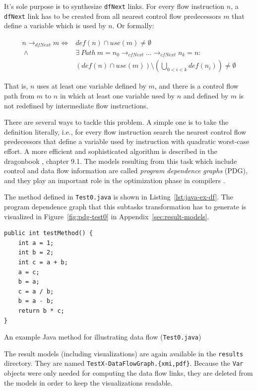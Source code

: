 \documentclass[10pt]{article}
\begin{document}
It's sole purpose is to synthesize \verb|dfNext| links.  For every flow
instruction $n$, a \verb|dfNext| link has to be created from all nearest
control flow predecessors $m$ that define a variable which is used by $n$.  Or
formally:

\begin{align*}
  n \rightarrow_{dfNext} m  \iff {} & def(n) \cap use(m) \neq \emptyset\\
  ~\land {} & \exists~Path~m = n_0 \rightarrow_{cfNext} ... \rightarrow_{cfNext} n_k = n:\\
  & \left(def(n) \cap use(m)\right) \setminus \left(\bigcup_{0 < i < k} def(n_i)\right) \neq \emptyset
\end{align*}

That is, $n$ uses at least one variable defined by $m$, and there is a control
flow path from $m$ to $n$ in which at least one variable used by $n$ and
defined by $m$ is not redefined by intermediate flow instructions.

There are several ways to tackle this problem.  A simple one is to take the
definition literally, i.e., for every flow instruction search the nearest
control flow predecessors that define a variable used by instruction with
quadratic worst-case effort.  A more efficient and sophisticated algorithm is
described in the dragonbook \cite{Aho:CPTT}, chapter 9.1.  The models resulting
from this task which include control and data flow information are called
\emph{program dependence graphs} (PDG), and they play an important role in the
optimization phase in compilers \cite{Ferrante:1987:PDG:24039.24041}.

The method defined in \verb|Test0.java| is shown in
Listing~\ref{lst:java-ex-df}.  The program dependence graph that this subtasks
transformation has to generate is visualized in Figure~\ref{fig:pdg-test0} in
Appendix~\ref{sec:result-models}.

\begin{listing}
  \begin{verbatim}
public int testMethod() {
    int a = 1;
    int b = 2;
    int c = a + b;
    a = c;
    b = a;
    c = a / b;
    b = a - b;
    return b * c;
}
  \end{verbatim}
  \caption{An example Java method for illustrating data flow
    (\texttt{Test0.java})}
  \label{lst:java-ex-df}
\end{listing}


The result models (including visualizations) are again available in the
\verb|results| directory.  They are named \verb|TestX-DataFlowGraph.{xmi,pdf}|.
Because the \verb|Var| objects were only needed for computing the data flow
links, they are deleted from the models in order to keep the visualizations
readable.
\end{document}
